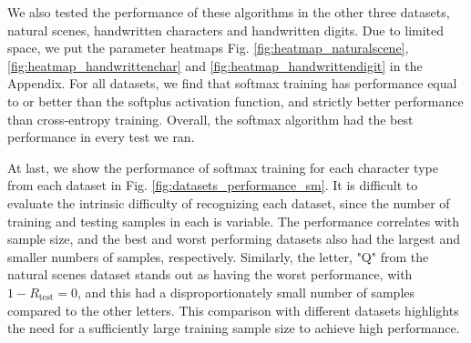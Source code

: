 \documentclass[journal,a4paper,onecolumn,11pt]{IEEEtran}
\begin{document}
We also tested the performance of these algorithms in the other three datasets, natural scenes, handwritten characters and handwritten digits. Due to limited space, we put the parameter heatmaps Fig. \ref{fig:heatmap_naturalscene}, \ref{fig:heatmap_handwrittenchar} and \ref{fig:heatmap_handwrittendigit} in the Appendix. For all datasets, we find that softmax training has performance equal to or better than the softplus activation function, and strictly better performance than cross-entropy training. Overall, the softmax algorithm had the best performance in every test we ran.

At last, we show the performance of softmax training for each character type from each dataset in Fig. \ref{fig:datasets_performance_sm}. It is difficult to evaluate the intrinsic difficulty of recognizing each dataset, since the number of training and testing samples in each is variable. The performance correlates with sample size, and the best and worst performing datasets also had the largest and smaller numbers of samples, respectively. Similarly, the letter, "Q" from the natural scenes dataset stands out as having the worst performance, with $1-R_{\text{test}}=0$, and this had a disproportionately small number of samples compared to the other letters. This comparison with different datasets highlights the need for a sufficiently large training sample size to achieve high performance.
\end{document}
